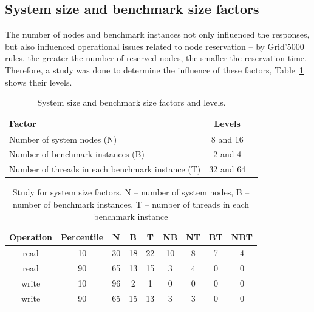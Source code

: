 \documentclass[man,floatsintext,12pt]{apa6}
\begin{document}
\subsection{System size and benchmark size factors}

The number of nodes and benchmark instances not only influenced the
responses, but also influenced operational issues related to node reservation --
by Grid'5000 rules, the greater the number of reserved nodes, the smaller the
reservation time. Therefore, a study was done to determine the influence of
these factors, Table~\ref{tab:system_size_and_benchmark_size_factors} shows
their levels.

\begin{table}[h!]
\caption{System size and benchmark size factors and levels.}
\label{tab:system_size_and_benchmark_size_factors}
\begin{tabular}{lcc} \toprule

Factor & Levels \\ \midrule

Number of system nodes (N) & 8 and 16\\

Number of benchmark instances (B) & 2 and 4\\

Number of threads in each benchmark instance (T) & 32 and 64 \\ \bottomrule

\end{tabular}
\end{table}

\begin{table}[h!]
  \caption{Study for system size factors. N -- number of system nodes, B --
number of benchmark instances, T -- number of threads in each benchmark
instance}
  \label{tab:estudo_para_fatores_de_tamanho_do_sistema}
  \begin{tabular}{ccccccccc}         \toprule
  Operation & Percentile & N & B & T & NB & NT & BT & NBT\\ \midrule
  
  read & 10 & 30 & 18 & 22 & 10 & 8 & 7 & 4 \\
  
  read & 90 & 65 & 13 & 15 & 3 & 4 & 0 & 0 \\
  
  write & 10 & 96 & 2 & 1 & 0 & 0 & 0 & 0 \\
  
  write & 90 & 65 & 15 & 13 & 3 & 3 & 0 & 0 \\ \bottomrule
  \end{tabular}
\end{table}
\end{document}
